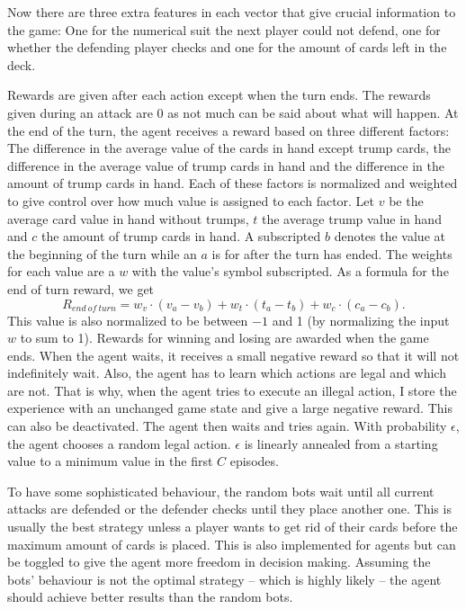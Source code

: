 \documentclass[a4paper,titlepage]{article}
\begin{document}
Now there are three extra features in each vector that give crucial information to the game: One for the numerical suit the next player could not defend, one for whether the defending player checks and one for the amount of cards left in the deck.

Rewards are given after each action except when the turn ends. The rewards given during an attack are 0 as not much can be said about what will happen. At the end of the turn, the agent receives a reward based on three different factors: The difference in the average value of the cards in hand except trump cards, the difference in the average value of trump cards in hand and the difference in the amount of trump cards in hand. Each of these factors is normalized and weighted to give control over how much value is assigned to each factor.
Let $v$ be the average card value in hand without trumps, $t$ the average trump value in hand and $c$ the amount of trump cards in hand. A subscripted $b$ denotes the value at the beginning of the turn while an $a$ is for after the turn has ended. The weights for each value are a $w$ with the value's symbol subscripted. As a formula for the end of turn reward, we get
\begin{equation*}
  R_{end\ of\ turn} = w_v \cdot (v_a - v_b) + w_t \cdot (t_a - t_b) + w_c \cdot (c_a - c_b).
\end{equation*}
This value is also normalized to be between $-1$ and 1 (by normalizing the input $w$ to sum to 1). Rewards for winning and losing are awarded when the game ends. When the agent waits, it receives a small negative reward so that it will not indefinitely wait. Also, the agent has to learn which actions are legal and which are not. That is why, when the agent tries to execute an illegal action, I store the experience with an unchanged game state and give a large negative reward. This can also be deactivated. The agent then waits and tries again. With probability $\epsilon$, the agent chooses a random legal action. $\epsilon$ is linearly annealed from a starting value to a minimum value in the first $C$ episodes.

To have some sophisticated behaviour, the random bots wait until all current attacks are defended or the defender checks until they place another one. This is usually the best strategy unless a player wants to get rid of their cards before the maximum amount of cards is placed. This is also implemented for agents but can be toggled to give the agent more freedom in decision making. Assuming the bots' behaviour is not the optimal strategy -- which is highly likely -- the agent should achieve better results than the random bots.
\end{document}
